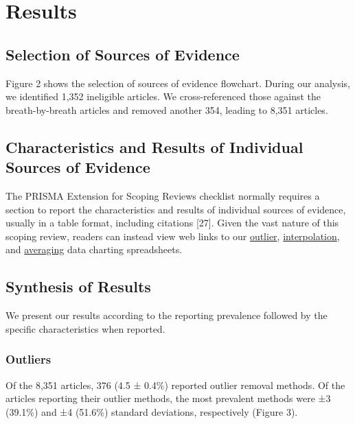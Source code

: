 \documentclass[
  letterpaper,
  DIV=11,
  numbers=noendperiod]{scrartcl}
\begin{document}
\section{Results}\label{sec-results}

\subsection{Selection of Sources of
Evidence}\label{selection-of-sources-of-evidence-1}

Figure 2 shows the selection of sources of evidence flowchart. During
our analysis, we identified 1,352 ineligible articles. We
cross-referenced those against the breath-by-breath articles and removed
another 354, leading to 8,351 articles.

\subsection{Characteristics and Results of Individual Sources of
Evidence}\label{characteristics-and-results-of-individual-sources-of-evidence}

The PRISMA Extension for Scoping Reviews checklist normally requires a
section to report the characteristics and results of individual sources
of evidence, usually in a table format, including citations {[}27{]}.
Given the vast nature of this scoping review, readers can instead view
web links to our
\href{https://docs.google.com/spreadsheets/d/1k_i4EP5U3zMltk8n21X-KHGoxUfR6XAJu6lxrVUufg0/edit?usp=sharing}{outlier},
\href{https://docs.google.com/spreadsheets/d/1mNHwyNwVeQeAAm-Jx43ImR91sLyRLSvad9oglHQB83A/edit?usp=sharing}{interpolation},
and
\href{https://docs.google.com/spreadsheets/d/1KdmDZuI1FS1XUK5zJm3JIqf4tQiBd0C1pW0p0PFZweU/edit?usp=sharing}{averaging}
data charting spreadsheets.

\subsection{Synthesis of Results}\label{synthesis-of-results-1}

We present our results according to the reporting prevalence followed by
the specific characteristics when reported.

\subsubsection{Outliers}\label{outliers-2}

Of the 8,351 articles, 376 (4.5 ± 0.4\%) reported outlier removal
methods. Of the articles reporting their outlier methods, the most
prevalent methods were ±3 (39.1\%) and ±4 (51.6\%) standard deviations,
respectively (Figure 3).
\end{document}
